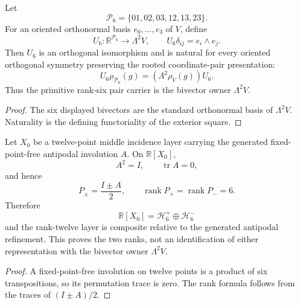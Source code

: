 \documentclass[11pt]{article}
\begin{document}
\begin{theorem}
\label{p1:thm:v558-coordinate-pair-bivector-owner}
Let
\[
 \mathcal P_6=\{01,02,03,12,13,23\}.
\]
For an oriented orthonormal basis \(e_0,\ldots,e_3\) of \(V\), define
\[
 U_6:\mathbb R^{\mathcal P_6}\longrightarrow\Lambda^2V,
 \qquad U_6\delta_{ij}=e_i\wedge e_j.
\]
Then \(U_6\) is an orthogonal isomorphism and is natural for every oriented
orthogonal symmetry preserving the rooted coordinate-pair presentation:
\[
 U_6\rho_{\mathcal P_6}(g)=(\Lambda^2\rho_V(g))U_6.
\]
Thus the primitive rank-six pair carrier is the bivector owner
\(\Lambda^2V\).
\end{theorem}
\begin{proof}
The six displayed bivectors are the standard orthonormal basis of
\(\Lambda^2V\).  Naturality is the defining functoriality of the exterior
square.
\end{proof}

\begin{proposition}
\label{p1:prop:v558-antipodal-twelve-six-six}
Let \(X_0\) be a twelve-point middle incidence layer carrying the generated
fixed-point-free antipodal involution \(A\).  On \(\mathbb R[X_0]\),
\[
 A^2=I,\qquad \operatorname{tr}A=0,
\]
and hence
\[
 P_\pm=\frac{I\pm A}{2},\qquad
 \operatorname{rank}P_+=\operatorname{rank}P_-=6.
\]
Therefore
\[
 \boxed{\mathbb R[X_0]=\mathcal H_6^+\oplus\mathcal H_6^-}
\]
and the rank-twelve layer is composite relative to the generated antipodal
refinement. This proves the two ranks, not an identification of either
representation with the bivector owner \(\Lambda^2V\).
\end{proposition}
\begin{proof}
A fixed-point-free involution on twelve points is a product of six
transpositions, so its permutation trace is zero.  The rank formula follows
from the traces of \((I\pm A)/2\).
\end{proof}
\end{document}
